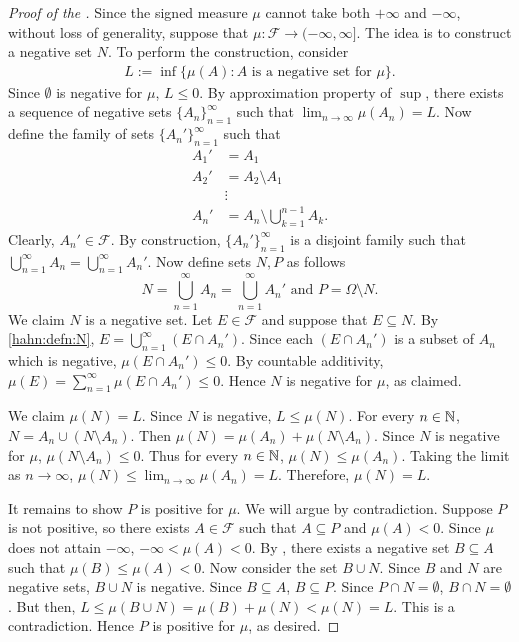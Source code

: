 \begin{proof}[Proof of the ]
Since the signed measure $\mu$ cannot take both $+\infty$ and $-\infty$, without loss of generality, suppose that $\mu : \mathcal{F} \to (-\infty, \infty]$. The idea is to construct a negative set $N$. To perform the construction, consider 
\begin{align*}
    L := \inf \{ \mu(A) : A \text{ is a negative set for $\mu$} \}.
\end{align*}
Since $\emptyset$ is negative for $\mu$, $L \leq 0$. By approximation property of $\sup$, there exists a sequence of negative sets $\{A_n\}_{n = 1}^\infty$ such that $\lim_{n \to \infty} \mu(A_n) = L$. Now define the family of sets $\{A_n'\}_{n = 1}^\infty$ such that
\begin{align*}
    A_{1}' &= A_1 \\
    A_{2}' &= A_2 \setminus A_1  \\
    & \vdots  \\
    A_{n}' &= A_n \setminus \bigcup_{k = 1} ^ {n - 1} A_k .
\end{align*}
Clearly, $A_n' \in \mathcal{F}$. By construction, $\{A_n'\}_{n = 1}^\infty$ is a disjoint family such that $\bigcup_{n = 1}^{\infty} A_n = \bigcup_{n = 1}^{\infty} A_n'$. Now define sets $N, P$ as follows
\begin{equation}
    \label{hahn:defn:N}
    N = \bigcup_{n = 1}^{\infty} A_n = \bigcup_{n = 1}^{\infty} A_n' \text{ and } P = \Omega \setminus N.
\end{equation}
We claim $N$ is a negative set. Let $E \in \mathcal{F}$ and suppose that $E \subseteq N$. By \ref{hahn:defn:N}, $E = \bigcup_{n=1}^{\infty} (E \cap A_n')$. Since each $(E \cap A_n')$ is a subset of $A_n$ which is negative, $\mu (E \cap A_n') \leq 0$. By countable additivity, $\mu (E) = \sum_{n = 1}^{\infty} \mu (E \cap A_n') \leq 0$. Hence $N$ is negative for $\mu$, as claimed. 

We claim $\mu(N) = L$. Since $N$ is negative, $L \leq \mu(N)$. For every $n \in {\mathbb N}$, $N = A_n \cup (N \setminus A_n)$. Then $\mu(N) = \mu(A_n) + \mu (N \setminus A_n)$. Since $N$ is negative for $\mu$, $\mu(N \setminus A_n) \leq 0$. Thus for every $n \in {\mathbb N}$, $\mu(N) \leq \mu(A_n)$. Taking the limit as $n \to \infty$, $\mu(N) \leq \lim_{n \to \infty} \mu (A_n) = L$. Therefore, $\mu(N) = L$. 

It remains to show $P$ is positive for $\mu$. We will argue by contradiction. Suppose $P$ is not positive, so there exists $A \in \mathcal{F}$ such that $A \subseteq P$ and $\mu(A) < 0$. Since $\mu$ does not attain $-\infty$, $-\infty < \mu(A) < 0$. By , there exists a negative set $B \subseteq A$ such that $\mu(B) \leq \mu(A) < 0$. Now consider the set $B \cup N$. Since $B$ and $N$ are negative sets, $B \cup N$ is negative. Since $B \subseteq A$, $B \subseteq P$. Since $P \cap N = \emptyset$, $B \cap N = \emptyset$. But then, $L \leq \mu(B \cup N) = \mu(B) + \mu(N) < \mu(N) = L$. This is a contradiction. Hence $P$ is positive for $\mu$, as desired.
\end{proof}
